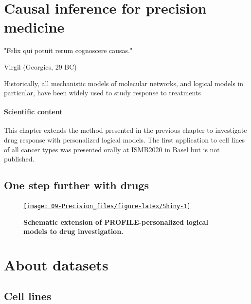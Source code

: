 \documentclass[a4paper,12pt,twoside,onecolumn,openright,final,oldfontcommands]{memoir}
\newcommand{\initial}[1]{
	\lettrine[lines=3,lhang=0.33,nindent=0em]{
		\color{gray}
     		{\textsc{#1}}}{}}
\let\BeginKnitrBlock\begin \let\EndKnitrBlock\end
\begin{document}
\chapter{Causal inference for precision
medicine}\label{causal-inference-for-precision-medicine}

\epigraph{"Felix qui potuit rerum cognoscere causas."}{Virgil (Georgics, 29 BC)}

\initial{H}istorically, all mechanistic models of molecular networks,
and logical models in particular, have been widely used to study
response to treatments

\BeginKnitrBlock{summarybox}
\subsubsection*{Scientific content}\label{scientific-content-6}

This chapter extends the method presented in the previous chapter to
investigate drug response with personalized logical models. The first
application to cell lines of all cancer types was presented orally at
ISMB2020 in Basel but is not published.
\EndKnitrBlock{summarybox}

\section{One step further with
drugs}\label{one-step-further-with-drugs-1}

\citep{de2015pragmatic}

\begin{figure}

{\centering \href{http://jonasbeal.shinyapps.io/application_causal_pm/}{\texttt{[image: 09-Precision\_files/figure-latex/Shiny-1]} }

}

\caption[Bimodality criteria and their combinations]{\textbf{Schematic extension of PROFILE-personalized
logical models to drug investigation.}}\label{fig:Shiny}
\end{figure}




\appendix {}


\chapter{About datasets}\label{appendix-datasets}

\section{Cell lines}\label{appendix-cl}
\end{document}
